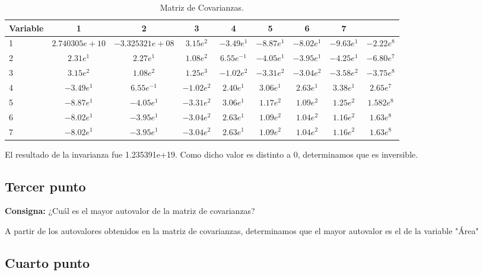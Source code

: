 \documentclass{article} %
\begin{document}
\begin{table}[H]
	\centering
		\begin{tabular}{||l || c | c | c | c | c | c | c | c ||}
			\hline
			\hline
			Variable & 1 & 2 & 3 & 4 & 5 & 6 & 7\\
			\hline			
			\hline
			1 & $2.740305e+10$ & $-3.325321e+08$ & $3.15e^{2}$& $-3.49e^{1}$ & $-8.87e^{1}$ & $-8.02e^{1}$ & $-9.63e^{1}$ & $-2.22e^{8}$\\
			\hline
			2 & $2.31e^{1}$ & $2.27e^{1}$ & $1.08e^{2}$& $6.55e^{-1}$ & $-4.05e^{1}$ & $-3.95e^{1}$ & $-4.25e^{1}$ & $-6.80e^{7}$\\
			\hline
			3 & $3.15e^{2}$ & $1.08e^{2}$ & $1.25e^{3}$& $-1.02e^{2}$ & $-3.31e^{2}$ & $-3.04e^{2}$ & $-3.58e^{2}$ & $-3.75e^{8}$\\
			\hline
			4 & $-3.49e^{1}$ & $6.55e^{-1}$ & $-1.02e^{2}$& $2.40e^{1}$ & $3.06e^{1}$ & $2.63e^{1}$ & $3.38e^{1}$ & $2.65e^{7}$\\
			\hline
			5 & $-8.87e^{1}$ & $-4.05e^{1}$ & $-3.31e^{2}$& $3.06e^{1}$ & $1.17e^{2}$ & $1.09e^{2}$ & $1.25e^{2}$ & $1.582e^{8}$\\
			\hline
			6 & $-8.02e^{1}$ & $-3.95e^{1}$ & $-3.04e^{2}$& $2.63e^{1}$ & $1.09e^{2}$ & $1.04e^{2}$ & $1.16e^{2}$ & $1.63e^{8}$\\
			\hline
			7 & $-8.02e^{1}$ & $-3.95e^{1}$ & $-3.04e^{2}$& $2.63e^{1}$ & $1.09e^{2}$ & $1.04e^{2}$ & $1.16e^{2}$ & $1.63e^{8}$\\
			\hline
			\hline
		\end{tabular}
		\caption{Matriz de Covarianzas.}
			\label{tab:table-punto-3-3}
\end{table}

El resultado de la invarianza fue 1.235391e+19. Como dicho valor es distinto a 0, determinamos que es inversible.

\subsection{Tercer punto}

\textbf{Consigna:} ¿Cuál es el mayor autovalor de la matriz de covarianzas?

A partir de los autovalores obtenidos en la matriz de covarianzas, determinamos que el mayor autovalor es el de la variable "Área"

\subsection{Cuarto punto}
\end{document}
